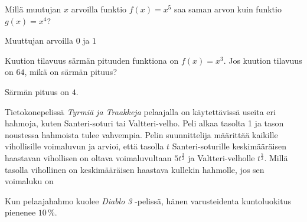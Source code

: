 \begin{tehtavasivu}
\begin{tehtava}
Millä muutujan $x$ arvoilla funktio $ f(x)=x^5$ saa saman arvon kuin funktio $ g(x)=x^4$?
\begin{vastaus}
Muuttujan arvoilla $0$ ja $1$
\end{vastaus}
\end{tehtava}

\begin{tehtava}
Kuution tilavuus särmän pituuden funktiona on $f(x) = x^3$. Jos kuution tilavuus on $64$, mikä on särmän pituus?
\begin{vastaus}
Särmän pituus on $4$.
\end{vastaus}
\end{tehtava}

\begin{tehtava}
Tietokonepelissä \emph{Tyrmiä ja Traakkeja} pelaajalla on käytettävissä useita eri hahmoja, kuten Santeri-soturi tai Valtteri-velho. Peli alkaa tasolta 1 ja tason noustessa hahmoista tulee vahvempia. Pelin suunnittelija määrittää kaikille vihollisille voimaluvun ja arvioi, että tasolla $t$ Santeri-soturille keskimääräisen haastavan vihollisen on oltava voimaluvultaan $5t^{\frac{3}{2}}$ ja Valtteri-velholle $t^{\frac{5}{2}}$. Millä tasolla vihollinen on keskimääräisen haastava kullekin hahmolle, jos sen voimaluku on
\begin{vastaus}
\end{vastaus}
\end{tehtava}

\begin{tehtava}
Kun pelaajahahmo kuolee \emph{Diablo 3} -pelissä, hänen varusteidenta kuntoluokitus pienenee $10$\,\%.
	\begin{vastaus}
	\end{vastaus}
\end{tehtava}

\end{tehtavasivu}
